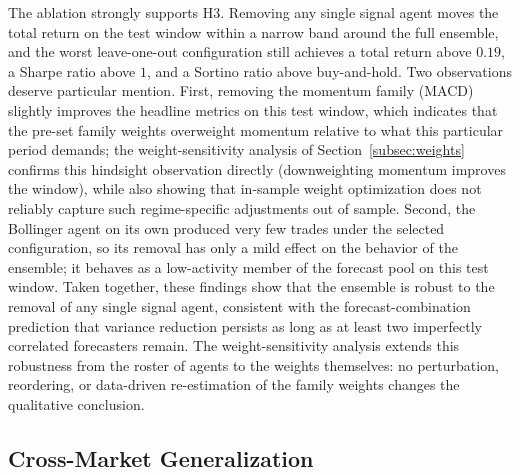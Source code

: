 \documentclass{ieeeaccess}
\begin{document}
The ablation strongly supports H3. Removing any single signal agent moves the total return on the test window within a narrow band around the full ensemble, and the worst leave-one-out configuration still achieves a total return above $0.19$, a Sharpe ratio above $1$, and a Sortino ratio above buy-and-hold. Two observations deserve particular mention. First, removing the momentum family (MACD) slightly improves the headline metrics on this test window, which indicates that the pre-set family weights overweight momentum relative to what this particular period demands; the weight-sensitivity analysis of Section~\ref{subsec:weights} confirms this hindsight observation directly (downweighting momentum improves the window), while also showing that in-sample weight optimization does not reliably capture such regime-specific adjustments out of sample. Second, the Bollinger agent on its own produced very few trades under the selected configuration, so its removal has only a mild effect on the behavior of the ensemble; it behaves as a low-activity member of the forecast pool on this test window. Taken together, these findings show that the ensemble is robust to the removal of any single signal agent, consistent with the forecast-combination prediction that variance reduction persists as long as at least two imperfectly correlated forecasters remain. The weight-sensitivity analysis extends this robustness from the roster of agents to the weights themselves: no perturbation, reordering, or data-driven re-estimation of the family weights changes the qualitative conclusion.

\subsection{Cross-Market Generalization}
\label{subsec:crossmarket}
\end{document}
